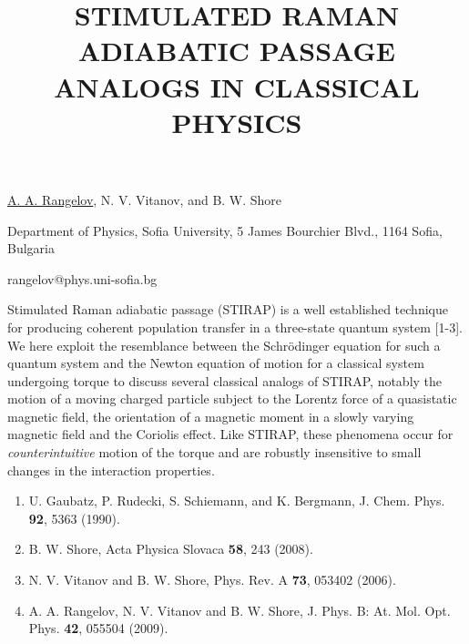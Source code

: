 \title{STIMULATED RAMAN ADIABATIC PASSAGE ANALOGS IN CLASSICAL PHYSICS}

\underline{A. A. Rangelov}, N. V. Vitanov, and B. W. Shore
  

{\normalsize{\vspace{-4mm}
Department of Physics, Sofia University, 5 James Bourchier Blvd.,
1164 Sofia, Bulgaria

\email rangelov@phys.uni-sofia.bg}}

Stimulated Raman adiabatic passage (STIRAP) is a well established technique
for producing coherent population transfer in a three-state quantum system
[1-3]. We here exploit the resemblance between the Schr\"{o}dinger equation for
such a quantum system and the Newton equation of motion for a classical
system undergoing torque to discuss several classical analogs of STIRAP,
notably the motion of a moving charged particle subject to the Lorentz force
of a quasistatic magnetic field, the orientation of a magnetic moment in a
slowly varying magnetic field and the Coriolis effect. Like STIRAP, these
phenomena occur for \emph{counterintuitive} motion of the torque and are
robustly insensitive to small changes in the interaction properties.

\vspace{-4mm} {\normalsize \begin{enumerate} \item U. Gaubatz, P.
Rudecki, S. Schiemann, and K. Bergmann, J. Chem. Phys. \textbf{92},
5363 (1990).\item B. W. Shore, Acta Physica Slovaca \textbf{58}, 243
(2008).\item N. V. Vitanov and B. W. Shore, Phys. Rev. A
\textbf{73}, 053402 (2006).\item A. A. Rangelov, N. V. Vitanov and
B. W. Shore, J. Phys. B: At. Mol. Opt. Phys. \textbf{42}, 055504
(2009).
\end{enumerate}
}

\vspace{\baselineskip}